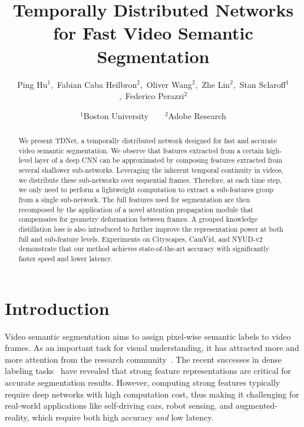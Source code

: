\documentclass[10pt,twocolumn,letterpaper]{article}
\begin{document}
\title{Temporally Distributed Networks for Fast Video Semantic Segmentation}

\author{
Ping Hu$^1$,~Fabian Caba Heilbron$^2$,~Oliver Wang$^2$,~Zhe Lin$^2$,~Stan Sclaroff$^1$,~Federico Perazzi$^2$
\and $^1$Boston University~~~~$^2$Adobe Research}



\maketitle


\begin{abstract}
We present TDNet, a temporally distributed network designed for fast and accurate video semantic segmentation.
We observe that features extracted from a certain high-level layer of a deep CNN can be approximated by composing features extracted from several shallower sub-networks.
Leveraging the inherent temporal continuity in videos, we distribute these sub-networks over sequential frames.
Therefore, at each time step, we only need to perform a lightweight computation to extract a sub-features group from a single sub-network.
The full features used for segmentation are then recomposed by the application of a novel attention propagation module that compensates for geometry deformation between frames.
A grouped knowledge distillation loss is also introduced to further improve the representation power at both full and sub-feature levels.
Experiments on Cityscapes, CamVid, and NYUD-v2 demonstrate that our method achieves state-of-the-art accuracy with significantly faster speed and lower latency.
\end{abstract}












 \section{Introduction}
Video semantic segmentation aims to assign pixel-wise semantic labels to video frames.
As an important task for visual understanding, it has attracted more and more attention from the research community~\cite{jin2017video,li2018low,nilsson2018semantic,shelhamer2016clockwork}. 
The recent successes in dense labeling tasks~\cite{chen2018encoder,fu2018dual,li2019expectation,liu2019auto, wu2019wider,zhao2017pyramid,zhang2018context,Zhu_2019_CVPR} have revealed that strong feature representations are critical for accurate segmentation results. 
However, computing strong features typically require deep networks with high computation cost, thus making it challenging for real-world applications like self-driving cars, robot sensing, and augmented-reality, which require both high accuracy \emph{and} low latency. 
\end{document}
